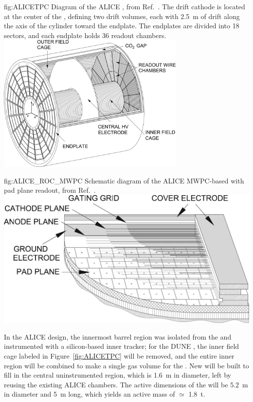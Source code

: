 \begin{dunefigure}{fig:ALICETPC}
{Diagram of the ALICE , from Ref.~\cite{Alme:2010ke}. The drift  cathode is located at the center of the , defining two drift volumes, each with \SI{2.5}{m} of drift along the axis of the cylinder toward the endplate. The endplates are divided into 18 sectors, and each endplate holds 36 readout chambers.}
    \includegraphics[width=0.7\textwidth]{graphics/alice_tpc_highres.jpg}
\end{dunefigure}


\begin{dunefigure}{fig:ALICE_ROC_MWPC}
{Schematic diagram of the ALICE MWPC-based  with pad plane readout, from Ref.~\cite{Alme:2010ke}.}
    \includegraphics{graphics/TPC_ROC_MWPC.jpg}
\end{dunefigure}

In the ALICE design, the innermost barrel region was isolated from the  and instrumented with a silicon-based inner tracker; for the DUNE , the inner field cage labeled in Figure~\ref{fig:ALICETPC} will be removed, and the entire inner region will be combined to make a single gas volume for the . New  will be built to fill in the central uninstrumented region, which is \SI{1.6}{m} in diameter, left by reusing the existing ALICE chambers.  The active dimensions of the  will be \SI{5.2}{m} in diameter and \SI{5}{m} long, which yields an active mass of $\simeq$ \SI{1.8}{t}. 


